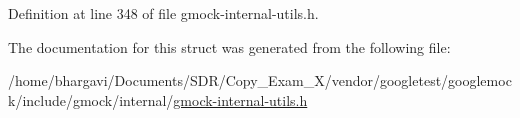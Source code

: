Definition at line 348 of file gmock-\/internal-\/utils.\+h.



The documentation for this struct was generated from the following file\+:\begin{DoxyCompactItemize}
\item 
/home/bhargavi/\+Documents/\+S\+D\+R/\+Copy\+\_\+\+Exam\+\_\+X/vendor/googletest/googlemock/include/gmock/internal/\hyperlink{gmock-internal-utils_8h}{gmock-\/internal-\/utils.\+h}\end{DoxyCompactItemize}
